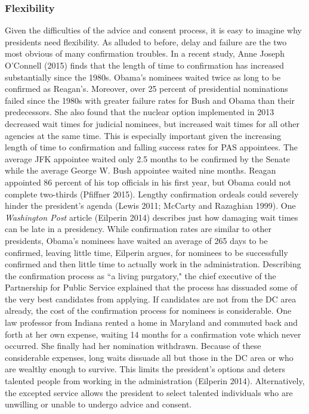 \documentclass[12pt]{article}
\begin{document}
\subsubsection*{Flexibility}

Given the difficulties of the advice and consent process, it is easy to imagine why presidents need flexibility. As alluded to before, delay and failure are the two most obvious of many confirmation troubles. In a recent study, Anne Joseph O'Connell (2015) finds that the length of time to confirmation has increased substantially since the 1980s. Obama's nominees waited twice as long to be confirmed as Reagan's. Moreover, over 25 percent of presidential nominations failed since the 1980s with greater failure rates for Bush and Obama than their predecessors. She also found that the nuclear option implemented in 2013 decreased wait times for judicial nominees, but increased wait times for all other agencies at the same time. This is especially important given the increasing length of time to confirmation and falling success rates for PAS appointees. The average JFK appointee waited only 2.5 months to be confirmed by the Senate while the average George W. Bush appointee waited nine months. Reagan appointed 86 percent of his top officials in his first year, but Obama could not complete two-thirds (Pfiffner 2015). Lengthy confirmation ordeals could severely hinder the president's agenda (Lewis 2011; McCarty and Razaghian 1999). One \textit{Washington Post} article (Eilperin 2014) describes just how damaging wait times can be late in a presidency. While confirmation rates are similar to other presidents, Obama's nominees have waited an average of 265 days to be confirmed, leaving little time, Eilperin argues, for nominees to be successfully confirmed and then little time to actually work in the administration. Describing the confirmation process as ``a living purgatory," the chief executive of the Partnership for Public Service explained that the process has dissuaded some of the very best candidates from applying. If candidates are not from the DC area already, the cost of the confirmation process for nominees is considerable. One law professor from Indiana rented a home in Maryland and commuted back and forth at her own expense, waiting 14 months for a confirmation vote which never occurred. She finally had her nomination withdrawn. Because of these considerable expenses, long waits dissuade all but those in the DC area or who are wealthy enough to survive. This limits the president's options and deters talented people from working in the administration (Eilperin 2014). Alternatively, the excepted service allows the president to select talented individuals who are unwilling or unable to undergo advice and consent. 
\end{document}

